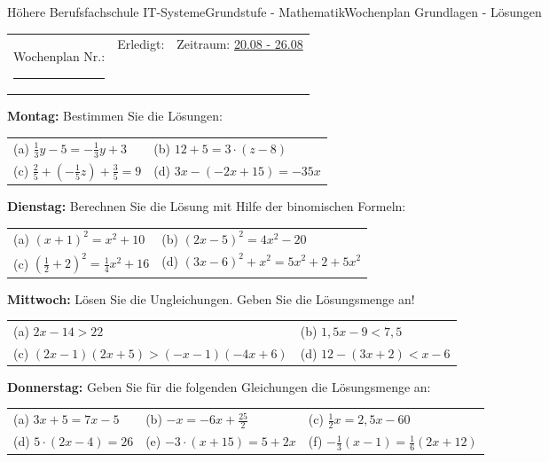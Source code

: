 \documentclass[oneside,openany,headings=optiontotoc,11pt,numbers=noenddot]{scrreprt}
\begin{document}
	\begin{worksheet}{Höhere Berufsfachschule IT-Systeme}{Grundstufe - Mathematik}{Wochenplan Grundlagen - Lösungen}
		\noindent
		\begin{tabularx}{\textwidth}{XXl}
			Wochenplan Nr.: \rule{0.15\textwidth}{1pt} & Erledigt: & Zeitraum: \underline{20.08 - 26.08}
		\end{tabularx}
	
		\begin{framed}
			\noindent
			\textbf{Montag:} Bestimmen Sie die Lösungen:\\
			\begin{tabularx}{\textwidth}{XX}
				(a) \(\frac{1}{3}y -5 = -\frac{1}{3}y + 3\) & (b) \(12 +5 = 3\cdot{}(z-8)\)\\
				(c) \(\frac{2}{5}+(-\frac{1}{5}z) + \frac{3}{5} = 9\) & (d) \(3x -(-2x+15) = -35x\)
			\end{tabularx}
		\end{framed}
		\begin{framed}
			\noindent
			\textbf{Dienstag:} Berechnen Sie die Lösung mit Hilfe der binomischen Formeln:\\
			\begin{tabularx}{\textwidth}{XX}
				(a) \((x+1)^2 = x^2 + 10\) & (b) \((2x-5)^2 = 4x^2 -20\)\\
				(c) \((\frac{1}{2} + 2)^2 = \frac{1}{4}x^2 +16\) & (d) \((3x-6)^2 + x^2 = 5x^2 +2 +5x^2\)
			\end{tabularx}
		\end{framed}
		\begin{framed}
			\noindent
			\textbf{Mittwoch:} Lösen Sie die Ungleichungen. Geben Sie die Lösungsmenge an!\\
			\begin{tabularx}{\textwidth}{XX}
				(a) \(2x -14 > 22\) & (b) \(1,5x-9 < 7,5\)\\
				(c) \((2x-1)(2x+5) > (-x-1)(-4x+6)\) & (d) \(12-(3x+2) < x-6\)
			\end{tabularx}
		\end{framed}
		\begin{framed}
			\noindent
			\textbf{Donnerstag:} Geben Sie für die folgenden Gleichungen die Lösungsmenge an:\\
			\begin{tabularx}{\textwidth}{XXX}
				(a) \(3x+5 = 7x - 5\) & (b) \(-x = -6x + \frac{25}{2}\) & (c) \(\frac{1}{2}x = 2,5x-60\)\\
				(d) \(5\cdot(2x-4) = 26\) & (e) \(-3\cdot(x+15) = 5 +2x\) & (f) \(-\frac{1}{3}(x-1) = \frac{1}{6}(2x+12)\)

\end{tabularx}
\end{framed}
\end{worksheet}
\end{document}
